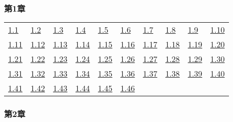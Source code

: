 \subsubsection*{第1章} 

\begin{tabular}{llllllllll}
\hyperref[練習問題 1.1]{1.1} &
\hyperref[練習問題 1.2]{1.2} &
\hyperref[練習問題 1.3]{1.3} &
\hyperref[練習問題 1.4]{1.4} &
\hyperref[練習問題 1.5]{1.5} &
\hyperref[練習問題 1.6]{1.6} &
\hyperref[練習問題 1.7]{1.7} &
\hyperref[練習問題 1.8]{1.8} &
\hyperref[練習問題 1.9]{1.9} &
\hyperref[練習問題 1.10]{1.10}
\\ 
\hyperref[練習問題 1.11]{1.11} &
\hyperref[練習問題 1.12]{1.12} &
\hyperref[練習問題 1.13]{1.13} &
\hyperref[練習問題 1.14]{1.14} &
\hyperref[練習問題 1.15]{1.15} &
\hyperref[練習問題 1.16]{1.16} &
\hyperref[練習問題 1.17]{1.17} &
\hyperref[練習問題 1.18]{1.18} &
\hyperref[練習問題 1.19]{1.19} &
\hyperref[練習問題 1.20]{1.20}
\\ 
\hyperref[練習問題 1.21]{1.21} &
\hyperref[練習問題 1.22]{1.22} &
\hyperref[練習問題 1.23]{1.23} &
\hyperref[練習問題 1.24]{1.24} &
\hyperref[練習問題 1.25]{1.25} &
\hyperref[練習問題 1.26]{1.26} &
\hyperref[練習問題 1.27]{1.27} &
\hyperref[練習問題 1.28]{1.28} &
\hyperref[練習問題 1.29]{1.29} &
\hyperref[練習問題 1.30]{1.30}
\\ 
\hyperref[練習問題 1.31]{1.31} &
\hyperref[練習問題 1.32]{1.32} &
\hyperref[練習問題 1.33]{1.33} &
\hyperref[練習問題 1.34]{1.34} &
\hyperref[練習問題 1.35]{1.35} &
\hyperref[練習問題 1.36]{1.36} &
\hyperref[練習問題 1.37]{1.37} &
\hyperref[練習問題 1.38]{1.38} &
\hyperref[練習問題 1.39]{1.39} &
\hyperref[練習問題 1.40]{1.40}
\\ 
\hyperref[練習問題 1.41]{1.41} &
\hyperref[練習問題 1.42]{1.42} &
\hyperref[練習問題 1.43]{1.43} &
\hyperref[練習問題 1.44]{1.44} &
\hyperref[練習問題 1.45]{1.45} &
\hyperref[練習問題 1.46]{1.46} &
\end{tabular} 

\subsubsection*{第2章} 

